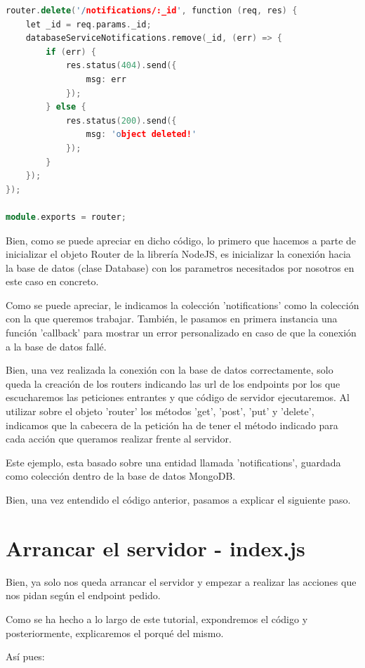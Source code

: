 \documentclass{article}
\begin{document}
\begin{lstlisting}[language=C++]
router.delete('/notifications/:_id', function (req, res) {
    let _id = req.params._id;
    databaseServiceNotifications.remove(_id, (err) => {
        if (err) {
            res.status(404).send({
                msg: err
            });
        } else {
            res.status(200).send({
                msg: 'object deleted!'
            });
        }
    });
});

module.exports = router;
\end{lstlisting}

Bien, como se puede apreciar en dicho código, lo primero que hacemos a parte de inicializar el objeto Router de la librería NodeJS, es inicializar la conexión hacia la base de datos (clase Database) con los parametros necesitados por nosotros en este caso en concreto.

Como se puede apreciar, le indicamos la colección 'notifications' como la colección con la que queremos trabajar. También, le pasamos en primera instancia una función 'callback' para mostrar un error personalizado en caso de que la conexión a la base de datos fallé.

Bien, una vez realizada la conexión con la base de datos correctamente, solo queda la creación de los routers indicando las url de los endpoints por los que escucharemos las peticiones entrantes y que código de servidor ejecutaremos. Al utilizar sobre el objeto 'router' los métodos 'get', 'post', 'put' y 'delete', indicamos que la cabecera de la petición ha de tener el método indicado para cada acción que queramos realizar frente al servidor.

Este ejemplo, esta basado sobre una entidad llamada 'notifications', guardada como colección dentro de la base de datos MongoDB.

Bien, una vez entendido el código anterior, pasamos a explicar el siguiente paso.

\section{Arrancar el servidor - index.js}
Bien, ya solo nos queda arrancar el servidor y empezar a realizar las acciones que nos pidan según el endpoint pedido.

Como se ha hecho a lo largo de este tutorial, expondremos el código y posteriormente, explicaremos el porqué del mismo.

Así pues:
\end{document}
